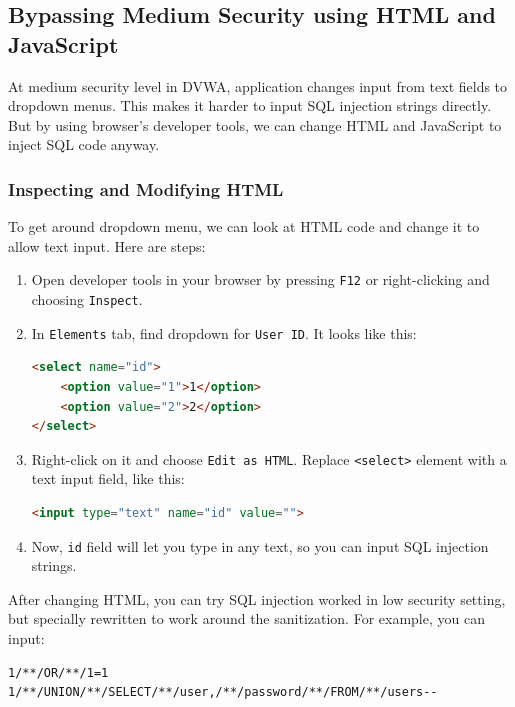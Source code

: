 \documentclass[12pt]{article}
\begin{document}
\subsection{Bypassing Medium Security using HTML and JavaScript}

At medium security level in DVWA, application changes input from text fields to dropdown menus. This makes it harder to input SQL injection strings directly. But by using browser's developer tools, we can change HTML and JavaScript to inject SQL code anyway.

\subsubsection{Inspecting and Modifying HTML}

To get around dropdown menu, we can look at HTML code and change it to allow text input. Here are steps:

\begin{enumerate}
    \item Open developer tools in your browser by pressing \texttt{F12} or right-clicking and choosing \texttt{Inspect}.
    \item In \texttt{Elements} tab, find dropdown for \texttt{User ID}. It looks like this:

\begin{lstlisting}[language=HTML]
<select name="id">
    <option value="1">1</option>
    <option value="2">2</option>
</select>
\end{lstlisting}

    \item Right-click on it and choose \texttt{Edit as HTML}. Replace \texttt{<select>} element with a text input field, like this:

\begin{lstlisting}[language=HTML]
<input type="text" name="id" value="">
\end{lstlisting}

    \item Now, \texttt{id} field will let you type in any text, so you can input SQL injection strings.

\end{enumerate}

After changing HTML, you can try  SQL injection worked in low security setting, but specially rewritten to work around the sanitization. For example, you can input:

\begin{lstlisting}
1/**/OR/**/1=1
1/**/UNION/**/SELECT/**/user,/**/password/**/FROM/**/users--
\end{lstlisting}
\end{document}
